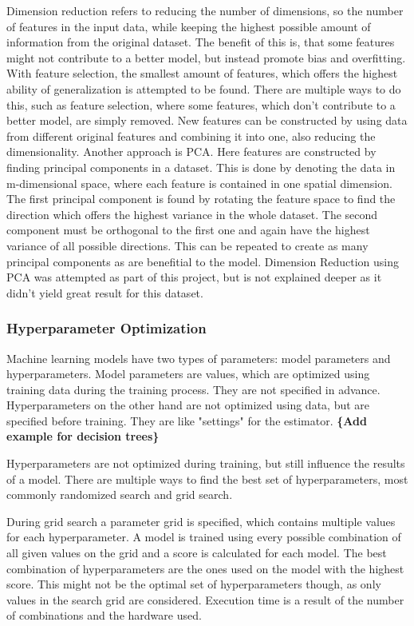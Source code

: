 Dimension reduction refers to reducing the number of dimensions, so the number of
features in the input data, while keeping the highest possible amount of information from
the original dataset. The benefit of this is, that some features might not contribute to a better model,
but instead promote bias and overfitting. With feature selection, the smallest amount of features,
which offers the highest ability of generalization is attempted to be found.
There are multiple ways to do this, such as feature selection, where some features, which don't
contribute to a better model, are simply removed.
New features can be constructed by using data from different original features and
combining it into one, also reducing the dimensionality.
Another approach is \ac{PCA}. Here features are constructed by finding
principal components in a dataset. This is done by denoting the data in m-dimensional space,
where each feature is contained in one spatial dimension.
The first principal component is found by rotating the feature space to find the direction
which offers the highest variance in the whole dataset.
The second component must be orthogonal to the first one and again have the highest variance
of all possible directions. This can be repeated to create as many principal components as are benefitial to the model.
Dimension Reduction using \ac{PCA} was attempted as part of this project,
but is not explained deeper as it didn't yield great result for this dataset.

\subsubsection{Hyperparameter Optimization}

Machine learning models have two types of parameters: model parameters and hyperparameters.
Model parameters are values, which are optimized using training data during the training process.
They are not specified in advance.
Hyperparameters on the other hand are not optimized using data, but are specified before training.
They are like "settings" for the estimator. 
\textbf{\{Add example for decision trees\}}

Hyperparameters are not optimized during training, but still influence the results of a model.
There are multiple ways to find the best set of hyperparameters, most commonly randomized search
and grid search.

During grid search a parameter grid is specified, which contains multiple values for each hyperparameter.
A model is trained using every possible combination of all given values on the grid and a score
is calculated for each model. The best combination of hyperparameters are the ones used on the model
with the highest score. This might not be the optimal set of hyperparameters though, as only values
in the search grid are considered. Execution time is a result of the number of combinations and the
hardware used.

